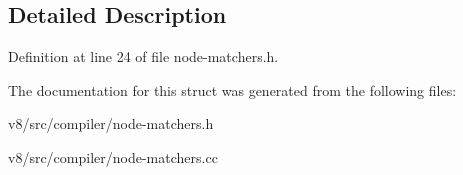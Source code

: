 \subsection{Detailed Description}


Definition at line 24 of file node-\/matchers.\+h.



The documentation for this struct was generated from the following files\+:\begin{DoxyCompactItemize}
\item 
v8/src/compiler/node-\/matchers.\+h\item 
v8/src/compiler/node-\/matchers.\+cc\end{DoxyCompactItemize}
